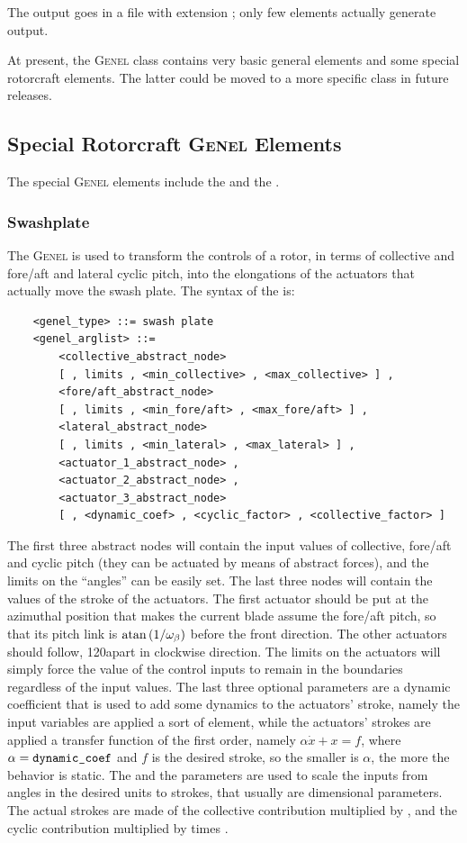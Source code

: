 \noindent
The output goes in a file with extension ; only few elements
actually generate output.

\noindent
At present, the \textsc{Genel} class contains very basic general elements
and some special rotorcraft elements.
The latter could be moved to a more specific class in future releases.

\subsection{Special Rotorcraft \textsc{Genel} Elements}
The special \textsc{Genel} elements include the 
and the .

\subsubsection{Swashplate}
The  \textsc{Genel} is used to transform the controls 
of a rotor, in terms of collective and fore/aft and lateral cyclic pitch, 
into the elongations of the actuators that actually move the swash plate.
The syntax of the  is:
\begin{verbatim}
    <genel_type> ::= swash plate
    <genel_arglist> ::=
        <collective_abstract_node> 
        [ , limits , <min_collective> , <max_collective> ] ,
        <fore/aft_abstract_node> 
        [ , limits , <min_fore/aft> , <max_fore/aft> ] ,
        <lateral_abstract_node> 
        [ , limits , <min_lateral> , <max_lateral> ] ,
        <actuator_1_abstract_node> ,
        <actuator_2_abstract_node> ,
        <actuator_3_abstract_node> 
        [ , <dynamic_coef> , <cyclic_factor> , <collective_factor> ]
\end{verbatim}
The first three abstract nodes will contain the input values 
of collective, fore/aft and cyclic pitch
(they can be actuated by means of abstract forces),
and the limits on the ``angles'' can be easily set. 
The last three nodes will contain the values of the stroke of the actuators.
The first actuator should be put at the azimuthal position 
that makes the current blade assume the fore/aft pitch,
so that its pitch link is $\mathrm{atan}\left( 1/\omega_{\beta} \right)$
before the front direction.
The other actuators should follow, 120\degr apart in clockwise direction.
The limits on the actuators will simply force the value of the control
inputs to remain in the boundaries regardless of the input values.
The last three optional parameters are a dynamic coefficient that is used to
add some dynamics to the actuators' stroke, namely the input variables are
applied a sort of   element, while the
actuators' strokes are applied a transfer function of the first order, namely
$ \alpha\dot{x}+x=f $, where $ \alpha=\texttt{dynamic\_coef} $ and $ f $ is
the desired stroke, so the smaller is $ \alpha $, the more the behavior is
static.
The  and the  parameters are
used to scale the inputs from angles in the desired units to strokes, that
usually are dimensional parameters. The actual strokes are made of the
collective contribution multiplied by , and the
cyclic contribution multiplied by  times 
.

